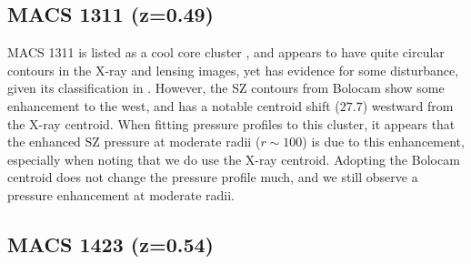 

\subsection{MACS 1311 (z=0.49)}
\label{sec:results_m1311}



MACS 1311 is listed as a cool core cluster \citep[e.g.][]{sayers2013}, and appears to have quite circular
contours in the X-ray and lensing images, yet has evidence for some disturbance, given its classification
in \citet{mann2012}. However, the SZ contours from Bolocam show some enhancement  to the west, and has
a notable centroid shift ($27.7$\asec) westward from the X-ray centroid. When fitting pressure profiles
to this cluster, it appears that the enhanced SZ pressure at moderate radii ($r \sim 100$\asec) is due
to this enhancement, especially when noting that we do use the X-ray centroid. Adopting the Bolocam centroid
does not change the pressure profile much, and we still observe a pressure enhancement at moderate radii.



\subsection{MACS 1423 (z=0.54)}
\label{sec:results_m1423}

